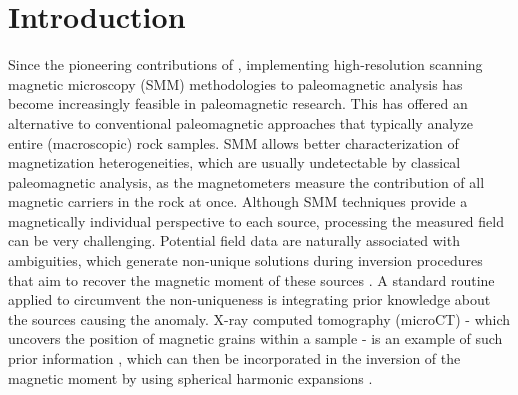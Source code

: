 \section{Introduction}

Since the pioneering contributions of \citet{Egli2000}, implementing high-resolution scanning magnetic microscopy (SMM) methodologies to paleomagnetic analysis has become increasingly feasible in paleomagnetic research. This has offered an alternative to conventional paleomagnetic approaches that typically analyze entire (macroscopic) rock samples. SMM allows better characterization of magnetization heterogeneities, which are usually undetectable by classical paleomagnetic analysis, as the magnetometers measure the contribution of all magnetic carriers in the rock at once. Although SMM techniques provide a magnetically individual perspective to each source, processing the measured field can be very challenging. Potential field data are naturally associated with ambiguities, which generate non-unique solutions during inversion procedures that aim to recover the magnetic moment of these sources \citep{Blakely1996}. A standard routine applied to circumvent the non-uniqueness is integrating prior knowledge about the sources causing the anomaly. X-ray computed tomography (microCT) - which uncovers the position of magnetic grains within a sample \citep{Fabian2019}- is an example of such prior information \citep[\textit{e.g.}][]{DeGroot2018, DeGroot2021, Koster2023}, which can then be incorporated in the inversion of the magnetic moment by using spherical harmonic expansions \citep[\textit{e.g.}][]{CortesOrtuno2021, CortesOrtuno2022}.

